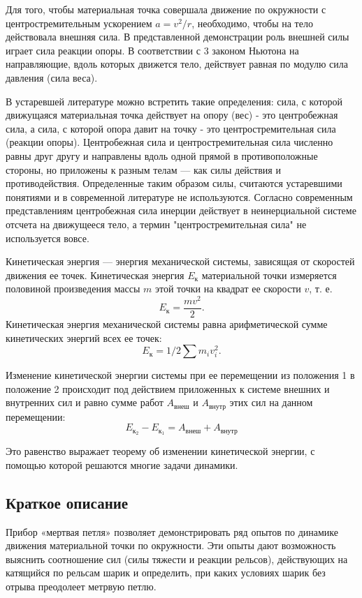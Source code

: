 \documentclass[All.tex]{subfiles}
\begin{document}
Для того, чтобы материальная точка совершала движение по окружности с центростремительным ускорением $a = v^2/r$, необходимо, чтобы на тело действовала внешняя сила. В представленной демонстрации роль внешней силы играет сила реакции опоры. В соответствии с 3 законом Ньютона на направляющие, вдоль которых движется тело, действует равная по модулю сила давления (сила веса).

В устаревшей литературе можно встретить такие определения: сила, с которой движущаяся материальная точка действует на опору (вес) - это центробежная сила, а сила, с которой опора давит на точку - это центростремительная сила (реакции опоры).
Центробежная сила и центростремительная сила численно равны друг другу и направлены вдоль одной прямой в противоположные стороны, но приложены к разным телам — как силы действия и противодействия.
Определенные таким образом силы, считаются устаревшими понятиями и в современной литературе не используются.
Согласно современным представлениям центробежная сила инерции действует в неинерциальной системе отсчета на движущееся тело, а термин "центростремительная сила" не используется вовсе.

Кинетическая энергия — энергия механической системы, зависящая от скоростей движения ее точек.
Кинетическая энергия $ E_{\text{к}} $ материальной точки измеряется половиной произведения массы $ m $ этой точки на квадрат ее скорости $ v $, т. е. $$ E_{\text{к}}  = \frac{mv^2}{2}. $$ 
Кинетическая энергия механической системы равна арифметической сумме кинетических энергий всех ее точек: 
$$ E_{\text{к}}  = 1/2 \sum  m_i v_i^2.$$ 

Изменение кинетической энергии системы при ее перемещении из положения 1 в положение 2 
происходит под действием приложенных к системе внешних и внутренних сил и равно сумме работ $ A_{\text{внеш}}$ и $ A_{\text{внутр}}$ этих сил на данном перемещении:
$$
E_{\text{к}_{2}} - E_{\text{к}_{1}} = A_{\text{внеш}} + A_{\text{внутр}}
$$
 
Это равенство выражает теорему об изменении кинетической энергии, с помощью которой решаются многие задачи динамики.

\subsection*{\textcolor{PineGreen}{Краткое описание}}

Прибор «мертвая петля» позволяет демонстрировать ряд опытов по динамике движения материальной точки по окружности.
Эти опыты дают возможность выяснить соотношение сил (силы тяжести и реакции рельсов), действующих на катящийся по рельсам шарик и определить, при каких условиях шарик без отрыва преодолеет метрвую петлю.
\end{document}
